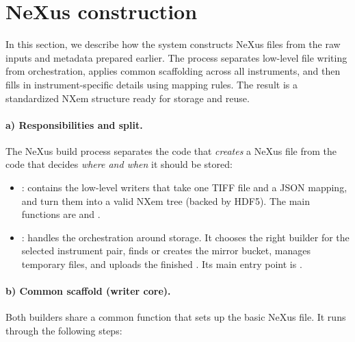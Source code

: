 
\section{NeXus construction}\label{sec:nexus-construction}

In this section, we describe how the system constructs NeXus files from the raw 
inputs and metadata prepared earlier. The process separates low-level file 
writing from orchestration, applies common scaffolding across all instruments, 
and then fills in instrument-specific details using mapping rules. The result is 
a standardized NXem structure ready for storage and reuse.

\paragraph{a) Responsibilities and split.}
The NeXus build process separates the code that \emph{creates} a NeXus file 
from the code that decides \emph{where and when} it should be stored:

\begin{itemize}
	\item {}: contains the low-level writers that take one TIFF file and a JSON mapping, 
	and turn them into a valid NXem tree (backed by HDF5). 
	The main functions are  and .
	
	\item {}: handles the orchestration around storage. 
	It chooses the right builder for the selected instrument pair, finds or creates the mirror bucket, 
	manages temporary files, and uploads the finished . 
	Its main entry point is .
\end{itemize}

\paragraph{b) Common scaffold (writer core).}
Both builders share a common function  that sets up the basic NeXus file. 
It runs through the following steps:

